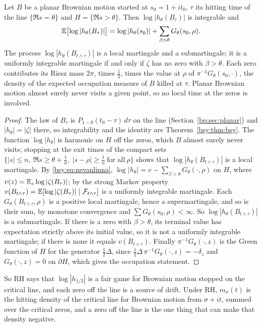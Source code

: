 \begin{proposition}\label{bsy:prop:yor}
Let $B$ be a planar Brownian motion started at $s_0=1+it_0$, $\tau$ its hitting time of the line $\{\Re s=\theta\}$ and $H=\{\Re s>\theta\}$. Then $\log|h_\theta(B_\tau)|$ is integrable and
\[
\mathbb{E}\bigl[\log|h_\theta(B_\tau)|\bigr]=\log|h_\theta(s_0)|+\sum_{\beta>\theta}G_\theta(s_0,\rho).
\]
The process $\log|h_\theta(B_{t\wedge\tau})|$ is a local martingale and a submartingale; it is a uniformly integrable martingale if and only if $\zeta$ has no zero with $\beta>\theta$. Each zero contributes its Riesz mass $2\pi$, times $\frac12$, times the value at $\rho$ of $\pi^{-1}G_\theta(s_0,\cdot)$, the density of the expected occupation measure of $B$ killed at $\tau$. Planar Brownian motion almost surely never visits a given point, so no local time at the zeros is involved.
\end{proposition}

\begin{proof}
The law of $B_\tau$ is $P_{1-\theta}(t_0-\tau)\,d\tau$ on the line (Section~\ref{bp:sec:planar}) and $|h_\theta|=|\zeta|$ there, so integrability and the identity are Theorem~\ref{bsy:thm:bsy}. The function $\log|h_\theta|$ is harmonic on $H$ off the zeros, which $B$ almost surely never visits; stopping at the exit times of the compact sets $\{|s|\le n,\ \Re s\ge\theta+\frac1n,\ |s-\rho|\ge\frac1n\ \text{for all}\ \rho\}$ shows that $\log|h_\theta(B_{t\wedge\tau})|$ is a local martingale. By \eqref{bsy:eq:nevanlinna}, $\log|h_\theta|=v-\sum_{\beta>\theta}G_\theta(\cdot,\rho)$ on $H$, where $v(z)=\mathbb{E}_z\log|\zeta(B_\tau)|$; by the strong Markov property $v(B_{t\wedge\tau})=\mathbb{E}[\log|\zeta(B_\tau)|\mid\mathcal F_{t\wedge\tau}]$ is a uniformly integrable martingale. Each $G_\theta(B_{t\wedge\tau},\rho)$ is a positive local martingale, hence a supermartingale, and so is their sum, by monotone convergence and $\sum G_\theta(s_0,\rho)<\infty$. So $\log|h_\theta(B_{t\wedge\tau})|$ is a submartingale. If there is a zero with $\beta>\theta$, its terminal value has expectation strictly above its initial value, so it is not a uniformly integrable martingale; if there is none it equals $v(B_{t\wedge\tau})$. Finally $\pi^{-1}G_\theta(\cdot,z)$ is the Green function of $H$ for the generator $\frac12\Delta$, since $\frac12\Delta\,\pi^{-1}G_\theta(\cdot,z)=-\delta_z$ and $G_\theta(\cdot,z)=0$ on $\partial H$, which gives the occupation statement.
\end{proof}

So RH says that $\log|h_{1/2}|$ is a fair game for Brownian motion stopped on the critical line, and each zero off the line is a source of drift. Under RH, $m_\sigma(t)$ is the hitting density of the critical line for Brownian motion from $\sigma+it$, summed over the critical zeros, and a zero off the line is the one thing that can make that density negative.

